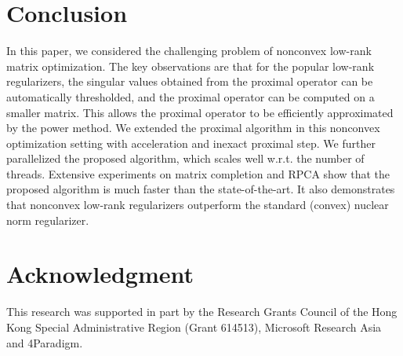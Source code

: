 \documentclass[10pt,journal,compsoc]{IEEEtran}
\begin{document}
\section{Conclusion}

In this paper, we considered the challenging problem of nonconvex low-rank matrix optimization.
The key observations are that for  the popular low-rank regularizers, 
the singular values 
obtained from the proximal operator
can be automatically thresholded, and the proximal operator can be
computed on a smaller matrix.  This allows the proximal operator to be efficiently
approximated by the power method. 
We extended the proximal algorithm in this nonconvex optimization setting with acceleration and inexact proximal step.
We further parallelized the proposed algorithm,
which scales well w.r.t. the number of threads.
Extensive experiments on matrix completion and RPCA 
show that the proposed algorithm is much faster than the state-of-the-art.
It also demonstrates that nonconvex low-rank regularizers outperform the  standard
(convex) nuclear norm regularizer.


\section*{Acknowledgment}

This research was supported in part by
the Research Grants Council of the Hong Kong Special Administrative Region
(Grant 614513),
Microsoft Research Asia 
and 4Paradigm.



\end{document}
